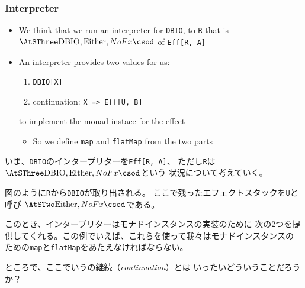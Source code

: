 \begin{frame}
  \frametitle{Interpreter}

  \pause
  \begin{itemize}
    \item<+-> We think that we run an interpreter for \lstinline|DBIO|,
    to \lstinline|R| that is $\SThree{\lstinline|DBIO|,\lstinline|Either|,NoFx}$
    of \lstinline|Eff[R, A]|
    \begin{center}
    \end{center}

    \item<+-> An interpreter provides two values for us:
    \begin{enumerate}
      \item \lstinline|DBIO[X]|
      \item continuation: \lstinline|X => Eff[U, B]|
    \end{enumerate}
    to implement the monad instace for the effect
    
    \begin{itemize}
      \item So we define \lstinline|map| and \lstinline|flatMap|
      from the two parts
    \end{itemize}
  \end{itemize}


  \begin{notes}
    \item いま、\lstinline|DBIO|のインタープリターを\lstinline|Eff[R, A]|、
    ただし\lstinline|R|は$\SThree{\lstinline|DBIO|,\lstinline|Either|,NoFx}$という
    状況について考えていく。

    \item 図のように\lstinline|R|から\lstinline|DBIO|が取り出される。
    ここで残ったエフェクトスタックを\lstinline|U|と呼び
    $\STwo{\lstinline|Either|,NoFx}$である。

    \item このとき、インタープリターはモナドインスタンスの実装のために
    次の2つを提供してくれる。この例でいえば、これらを使って我々はモナドインスタンスの
    ための\lstinline|map|と\lstinline|flatMap|をあたえなければならない。

    \item ところで、ここでいうの継続（\emph{continuation}）とは
    いったいどういうことだろうか？
  \end{notes}
\end{frame}

